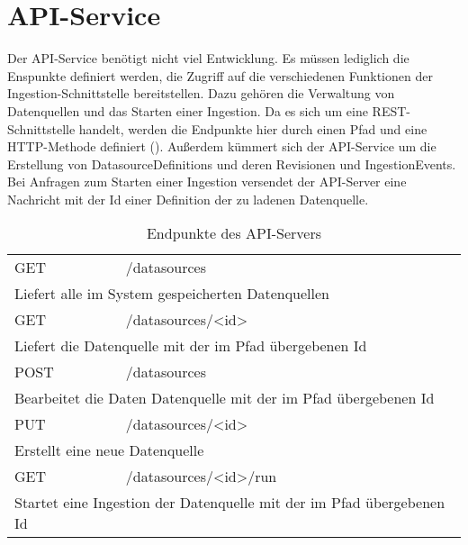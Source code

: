 \section{API-Service}

Der API-Service benötigt nicht viel Entwicklung.
Es müssen lediglich die Enspunkte definiert werden, die Zugriff auf die verschiedenen Funktionen der Ingestion-Schnittstelle bereitstellen.
Dazu gehören die Verwaltung von Datenquellen und das Starten einer Ingestion.
Da es sich um eine REST-Schnittstelle handelt, werden die Endpunkte hier durch einen Pfad und eine HTTP-Methode definiert ().
Außerdem kümmert sich der API-Service um die Erstellung von DatasourceDefinitions und deren Revisionen und IngestionEvents.
Bei Anfragen zum Starten einer Ingestion versendet der API-Server eine Nachricht mit der Id einer Definition der zu ladenen Datenquelle.

    {\renewcommand{\arraystretch}{1.8}
        \begin{table}[ht]
            \centering
            \begin{tabularx}{\linewidth}{|lX|}
                \hline
                GET  & /datasources                                                                         \\
                \multicolumn{2}{|l|}{Liefert alle im System gespeicherten Datenquellen}                     \\
                \hline
                GET  & /datasources/\textless id\textgreater                                                \\
                \multicolumn{2}{|l|}{Liefert die Datenquelle mit der im Pfad übergebenen Id}                \\
                \hline
                POST & /datasources                                                                         \\
                \multicolumn{2}{|l|}{Bearbeitet die Daten Datenquelle mit der im Pfad übergebenen Id}       \\
                \hline
                PUT  & /datasources/\textless id\textgreater                                                \\
                \multicolumn{2}{|l|}{Erstellt eine neue Datenquelle}                                        \\
                \hline
                GET  & /datasources/\textless id\textgreater/run                                            \\
                \multicolumn{2}{|l|}{Startet eine Ingestion der Datenquelle mit der im Pfad übergebenen Id} \\
                \hline
            \end{tabularx}
            \caption{Endpunkte des API-Servers}
            \label{tab:endpunkte}
        \end{table}
    }
